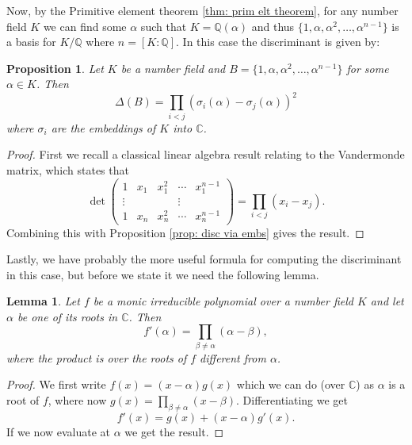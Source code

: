 \documentclass[11pt,a4paper]{report}
\theoremstyle{plain}
\newtheorem{lemma}[subsection]{Lemma}
\newtheorem{prop}[subsection]{Proposition}
\theoremstyle{definition}
\theoremstyle{definition}
\def\CC{\mathbb{C}}
\def\QQ{\mathbb{Q}}
\def \a{\alpha}
\begin{document}
	Now, by the Primitive element theorem \ref{thm: prim elt theorem}, for any number field $K$ we can find some $\a$ such that $K=\QQ(\a)$ and thus $\{1,\a,\a^2,\dots,\a^{n-1}\}$ is a basis for $K/\QQ$ where $n=[K:\QQ]$. In this case the discriminant is given by:
	
	\begin{prop}\label{prop: disc of prim elt basis}
		Let $K$ be a number field and $B=\{1,\a,\a^2,\dots,\a^{n-1}\}$ for some $\a \in K$. Then \[\Delta(B)=\prod_{i < j} (\sigma_i(\a)-\sigma_j(\a))^2\] where $\sigma_i$ are the embeddings of $K $ into $\CC$.
	\end{prop}
	
	\begin{proof}
		First we recall a classical linear algebra result relating to the Vandermonde matrix, which states that  \[\det \left (\begin{matrix} 1 & x_1& x_1^2&\cdots&x_1^{n-1} \\ \vdots & & & \vdots \\   1 & x_n& x_n^2&\cdots&x_n^{n-1}
		\end{matrix} \right ) =\prod_{i<j} (x_i-x_j).\] Combining this with Proposition \ref{prop: disc via embs} gives the result.
	\end{proof}
	
	
	
	
	Lastly, we have probably the more useful formula for computing the discriminant in this case, but before we state it we need the following lemma.
	
	\begin{lemma}\label{lem: diff of irr pol}
		Let $f$ be a monic irreducible polynomial over a number field $K$ and let $\a$ be one of its roots in $\CC$. Then \[f'(\a)=\prod_{\beta \neq \a} (\a-\beta),  \] where the product is over the roots of $f$ different from $\a$.
	\end{lemma}
	
	\begin{proof}
		We first write $f(x)=(x-\a)g(x)$ which we can do (over $\CC$) as $\a$ is a root of $f$, where now $g(x)=\prod_{\beta \neq \a} (x-\beta)$. Differentiating we get \[f'(x)=g(x)+(x-\a)g'(x).\] If we now evaluate at $\a$ we get the result.
	\end{proof}
	
\end{document}
